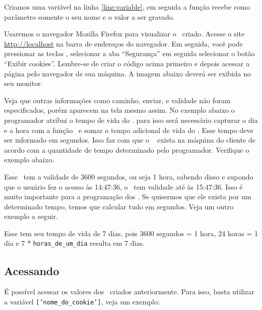 Criamos uma variável na linha \ref{line:variable}, em seguida a função \funcaosetcookie recebe como 
parâmetro somente o seu nome e o valor a ser gravado.

Usaremos o navegador Mozilla Firefox para visualizar o \cookie~criado. Acesse o site 
\url{http://localhost} na barra de endereços do navegador. Em seguida, você pode pressionar as 
teclas , selecionar a aba ``Segurança'' em seguida selecionar o botão 
``Exibir cookies''. Lembre-se de criar o código acima primeiro e depois acessar a página pelo 
navegador de sua máquina. A imagem abaixo deverá ser exibida no seu monitor.


Veja que outras informações como caminho, enviar, e validade não foram especificados, 
porém aparecem na tela mesmo assim. No exemplo abaixo o programador atribui o tempo de vida do 
\cookie. para isso será necessário capturar o dia e a hora com a função \funcaotime~e somar o tempo 
adicional de vida do \cookie. Esse tempo deve ser informado em segundos. Isso faz com que o \cookie~
exista na máquina do cliente de acordo com a quantidade de tempo determinado pelo programador.
Verifique o exemplo abaixo.



Esse \cookie~tem a validade de 3600 segundos, ou seja 1 hora, sabendo disso e supondo que 
o usuário fez o acesso às 14:47:36, o \cookie~tem validade até às 15:47:36. Isso é muito 
importante para a programação dos \cookies. Se quisermos que ele exista por um determinado 
tempo, temos que calcular tudo em segundos. Veja um outro exemplo a seguir.



Esse \cookie tem seu tempo de vida de 7 dias, pois 3600 segundos = 1 hora, 24 horas = 1 
dia e 7 * \texttt{horas\_de\_um\_dia} resulta em 7 dias.

\subsection{Acessando \titulocookies}
\label{acessando-cookies}

É possível acessar os valores dos \cookies~criados anteriormente. Para isso, basta utilizar 
a variável \variavelcookie\texttt{['nome\_do\_cookie']}, veja um exemplo:

